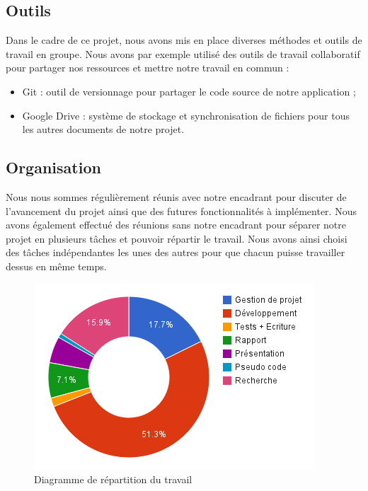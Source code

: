 \subsection{Outils}

Dans le cadre de ce projet, nous avons mis en place diverses méthodes et outils de travail en groupe. Nous avons par exemple utilisé des outils de travail collaboratif pour partager nos ressources et mettre notre travail en commun :
\begin{itemize}
  \item Git : outil de versionnage pour partager le code source de notre application ;
  \item Google Drive : système de stockage et synchronisation de fichiers pour tous les autres documents de notre projet.
\end{itemize}

\subsection{Organisation}

Nous nous sommes régulièrement réunis avec notre encadrant pour discuter de l'avancement du projet ainsi que des futures fonctionnalités à implémenter. Nous avons également effectué des réunions sans notre encadrant pour séparer notre projet en plusieurs tâches et pouvoir répartir le travail. Nous avons ainsi choisi des tâches indépendantes les unes des autres pour que chacun puisse travailler dessus en même temps.

\begin{figure}[!h]
  \begin{center}
  \includegraphics[scale=1]{res/05-1-work_repartition_chart.png}
  \caption{Diagramme de répartition du travail}
  \label{05-1-work_repartition_chart}
  \end{center}
\end{figure}

